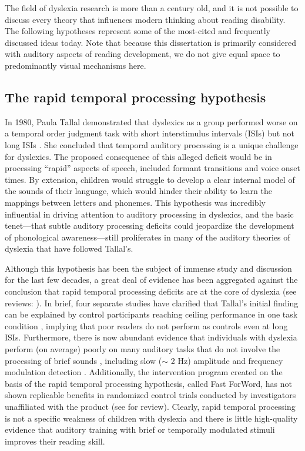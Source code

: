 \documentclass[../uwthesis.tex]{subfiles}
\begin{document}
The field of dyslexia research is more than a century old, and it is not possible to discuss every theory that influences modern thinking about reading disability. The following hypotheses represent some of the most-cited and frequently discussed ideas today. Note that because this dissertation is primarily considered with auditory aspects of reading development, we do not give equal space to predominantly visual mechanisms here. 

\subsection{The rapid temporal processing hypothesis}
In 1980, Paula Tallal demonstrated that dyslexics as a group performed worse on a temporal
order judgment task with short interstimulus intervals (ISIs) but not long ISIs \citep{Tallal1980}. She concluded that temporal auditory processing is a unique challenge for dyslexics. The proposed consequence of this alleged deficit would be in processing “rapid” aspects of speech, included formant transitions and voice onset times. By extension, children would struggle to develop a clear internal model of the sounds of their language, which would hinder their ability to learn the mappings between letters and phonemes. This hypothesis was incredibly influential in driving attention to auditory processing in dyslexics, and the basic tenet—that subtle auditory processing deficits could jeopardize the development of phonological awareness—still proliferates in many of the auditory theories of dyslexia that have followed Tallal’s.

Although this hypothesis has been the subject of immense study and discussion for the last
few decades, a great deal of evidence has been aggregated against the conclusion that rapid temporal processing deficits are at the core of dyslexia (see reviews: \citep{Farmer1995,Rosen2003}). In brief, four separate studies have clarified that Tallal's initial finding can be explained by control participants reaching ceiling performance in one task condition \citep{Reed1989,Nittrouer1999,Marshall2001,Waber2001}, implying that poor readers do not perform as controls even at long ISIs. Furthermore, there is now abundant evidence that individuals with dyslexia perform (on average) poorly on many auditory tasks that do not involve the processing of brief sounds \citep{Hamalainen2013,Rosen2003,Ramus2003,Amitay2002}, including slow ($\sim$ 2 Hz) amplitude and frequency modulation detection \citep{Witton1998,Lorenzi2000,Stuart2006}. Additionally, the intervention program created on the basis of the rapid temporal processing hypothesis, called Fast ForWord, has not shown replicable benefits in randomized control trials conducted by investigators unaffiliated with the product (see \citep{Strong2011AProgram} for review). Clearly, rapid temporal processing is not a specific weakness of children with dyslexia and there is little high-quality evidence that auditory training with brief or temporally modulated stimuli improves their reading skill. 
\end{document}

